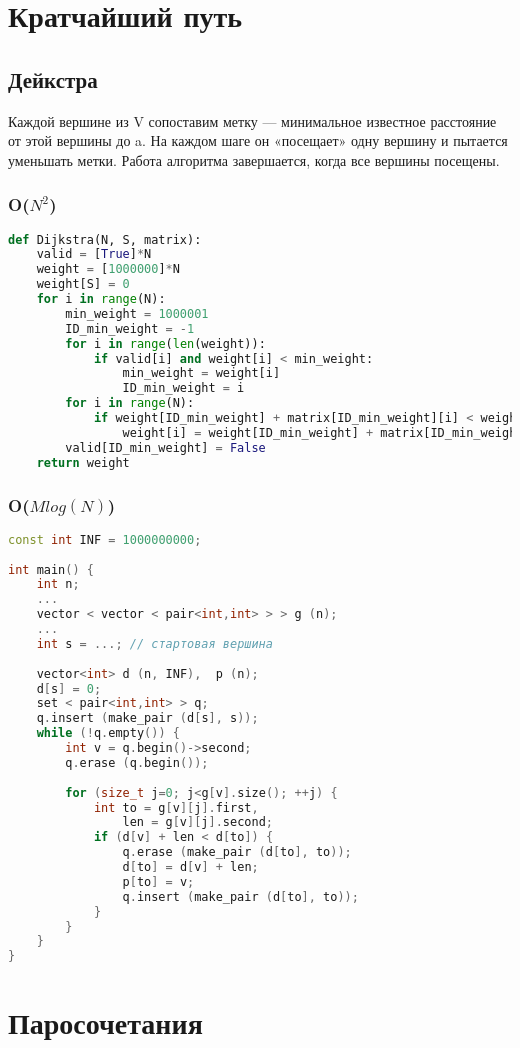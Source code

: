 \section{Кратчайший путь}
\subsection{Дейкстра}
Каждой вершине из V сопоставим метку — минимальное известное расстояние от этой вершины до a. На каждом шаге он «посещает» одну вершину и пытается уменьшать метки. Работа алгоритма завершается, когда все вершины посещены.
\subsubsection{O($N^2$)}
\begin{lstlisting}[language=Python]
def Dijkstra(N, S, matrix):
	valid = [True]*N        
	weight = [1000000]*N
	weight[S] = 0
	for i in range(N):
		min_weight = 1000001
		ID_min_weight = -1
		for i in range(len(weight)):
			if valid[i] and weight[i] < min_weight:
				min_weight = weight[i]
				ID_min_weight = i
		for i in range(N):
			if weight[ID_min_weight] + matrix[ID_min_weight][i] < weight[i]:
				weight[i] = weight[ID_min_weight] + matrix[ID_min_weight][i]
		valid[ID_min_weight] = False
	return weight
\end{lstlisting}
\subsubsection{O($Mlog(N)$)}
\begin{lstlisting}[language=C++]
const int INF = 1000000000;
 
int main() {
	int n;
	...
	vector < vector < pair<int,int> > > g (n);
	...
	int s = ...; // стартовая вершина
 
	vector<int> d (n, INF),  p (n);
	d[s] = 0;
	set < pair<int,int> > q;
	q.insert (make_pair (d[s], s));
	while (!q.empty()) {
		int v = q.begin()->second;
		q.erase (q.begin());
 
		for (size_t j=0; j<g[v].size(); ++j) {
			int to = g[v][j].first,
				len = g[v][j].second;
			if (d[v] + len < d[to]) {
				q.erase (make_pair (d[to], to));
				d[to] = d[v] + len;
				p[to] = v;
				q.insert (make_pair (d[to], to));
			}
		}
	}
}
\end{lstlisting}
\section{Паросочетания}
